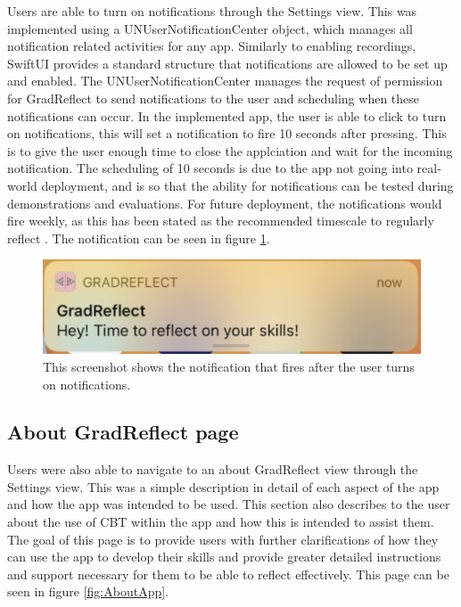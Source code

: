 \documentclass{l4proj}
\begin{document}
Users are able to turn on notifications through the Settings view. This was implemented using a UNUserNotificationCenter object, which manages all notification related activities for any app. Similarly to enabling recordings, SwiftUI provides a standard structure that notifications are allowed to be set up and enabled. The UNUserNotificationCenter manages the request of permission for GradReflect to send notifications to the user and scheduling when these notifications can occur. In the implemented app, the user is able to click to turn on notifications, this will set a notification to fire 10 seconds after pressing. This is to give the user enough time to close the applciation and wait for the incoming notification. The scheduling of 10 seconds is due to the app not going into real-world deployment, and is so that the ability for notifications can be tested during demonstrations and evaluations. For future deployment, the notifications would fire weekly, as this has been stated as the recommended timescale to regularly reflect \citep{bruno_reflective_2018}. The notification can be seen in figure \ref{fig:Notification}.

\begin{figure}
    \centering
    \includegraphics[scale=0.4]{images/Notification.pdf}    
    \caption{This screenshot shows the notification that fires after the user turns on notifications.}
    \label{fig:Notification} 
\end{figure}

\subsection{About GradReflect page}

Users were also able to navigate to an about GradReflect view through the Settings view. This was a simple description in detail of each aspect of the app and how the app was intended to be used. This section also describes to the user about the use of CBT within the app and how this is intended to assist them. The goal of this page is to provide users with further clarifications of how they can use the app to develop their skills and provide greater detailed instructions and support necessary for them to be able to reflect effectively. This page can be seen in figure \ref{fig:AboutApp}.
\end{document}

